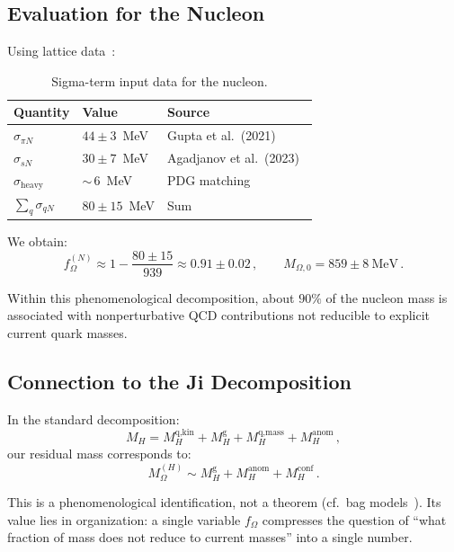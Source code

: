 \documentclass[11pt,a4paper]{article}
\begin{document}
\subsection{Evaluation for the Nucleon}

Using lattice data~\cite{Agadjanov2023,Gupta2021}:

\begin{table}[h]
\centering
\begin{tabular}{lll}
\toprule
Quantity & Value & Source \\
\midrule
$\sigma_{\pi N}$ & $44 \pm 3$~MeV & Gupta et al.\ (2021)~\cite{Gupta2021} \\
$\sigma_{sN}$ & $30 \pm 7$~MeV & Agadjanov et al.\ (2023)~\cite{Agadjanov2023} \\
$\sigma_{\text{heavy}}$ & ${\sim}\,6$~MeV & PDG matching~\cite{PDG2024} \\
$\sum_q \sigma_{qN}$ & $80 \pm 15$~MeV & Sum \\
\bottomrule
\end{tabular}
\caption{Sigma-term input data for the nucleon.}
\label{tab:sigma}
\end{table}

We obtain:
\begin{equation}
f_\Omega^{(N)} \approx 1 - \frac{80 \pm 15}{939} \approx 0.91 \pm 0.02\,,
\qquad
M_{\Omega,0} = 859 \pm 8~\text{MeV}\,.
\end{equation}

Within this phenomenological decomposition, about $90\%$ of the nucleon mass is associated with nonperturbative QCD contributions not reducible to explicit current quark masses.

\subsection{Connection to the Ji Decomposition}

In the standard decomposition:
\begin{equation}
M_H = M_H^{\text{q,kin}} + M_H^{\text{g}} + M_H^{\text{q,mass}} + M_H^{\text{anom}}\,,
\end{equation}
our residual mass corresponds to:
\begin{equation}
M_\Omega^{(H)} \sim M_H^{\text{g}} + M_H^{\text{anom}} + M_H^{\text{conf}}\,.
\end{equation}

This is a phenomenological identification, not a theorem (cf.\ bag models~\cite{Chodos1974}). Its value lies in organization: a single variable $f_\Omega$ compresses the question of ``what fraction of mass does not reduce to current masses'' into a single number.
\end{document}
